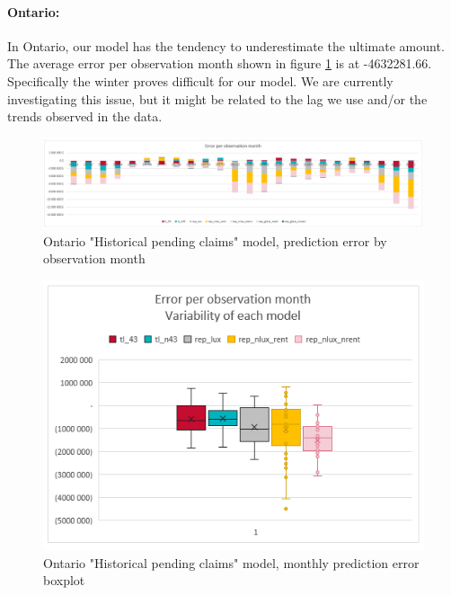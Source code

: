 	\paragraph{Ontario:}
		In Ontario, our model has the tendency to underestimate the ultimate amount. The average error per observation month shown in figure \ref{Fig_ON_current_er_by_month} is at -4632281.66. Specifically the winter proves difficult for our model. We are currently investigating this issue, but it might be related to the lag we use and/or the trends observed in the data.
		\begin{figure}[H]
			\begin{center}
				\includegraphics[scale=0.4]{Graphiques/ON_current_model_by_month} 
				\renewcommand{\figurename}{Figure}
				\caption{Ontario "Historical  pending claims" model, prediction error by observation month}\label{Fig_ON_current_er_by_month}
			\end{center}
		\end{figure}
		\begin{figure}[H]
			\begin{center}
				\includegraphics[scale=0.4]{Graphiques/ON_current_model_mustach} 
				\renewcommand{\figurename}{Figure}
				\caption{Ontario "Historical  pending claims" model, monthly prediction error boxplot}\label{Fig_ON_current_er_boxplot}
			\end{center}
		\end{figure}
